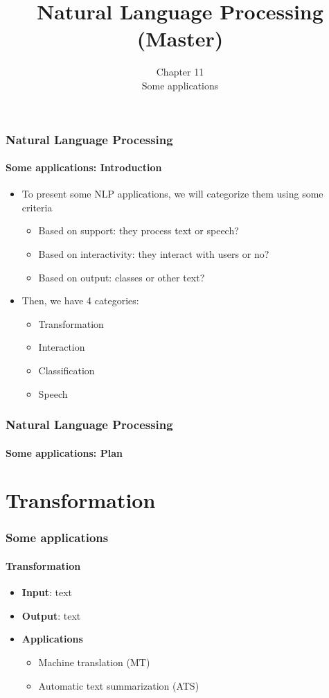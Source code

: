 \documentclass[xcolor=table]{beamer}
\title[ESI - NLP(master)]%
{Natural Language Processing (Master)}
\subtitle[11- Some applications]%
{Chapter 11\\Some applications}
\begin{document}
	
\begin{frame}
\frametitle{Natural Language Processing}
\framesubtitle{Some applications: Introduction}

	\begin{itemize}
		\item To present some NLP applications, we will categorize them using some criteria
		\begin{itemize}
			\item Based on support: they process text or speech?
			\item Based on interactivity: they interact with users or no?
			\item Based on output: classes or other text?
		\end{itemize}
		\item Then, we have 4 categories:
		\begin{itemize}
			\item Transformation
			\item Interaction
			\item Classification
			\item Speech
		\end{itemize}
	\end{itemize}

\end{frame}

\begin{frame}
\frametitle{Natural Language Processing}
\framesubtitle{Some applications: Plan}

\begin{multicols}{2}
\tableofcontents
\end{multicols}
\end{frame}

\section{Transformation}

\begin{frame}
	\frametitle{Some applications}
	\framesubtitle{Transformation}
	\begin{itemize}
		\item \textbf{Input}: text 
		\item \textbf{Output}: text
		\item \textbf{Applications} 
		\begin{itemize}
			\item Machine translation (MT)
			\item Automatic text summarization (ATS)
		\end{itemize}
	\end{itemize}
\end{frame}
\end{document}
